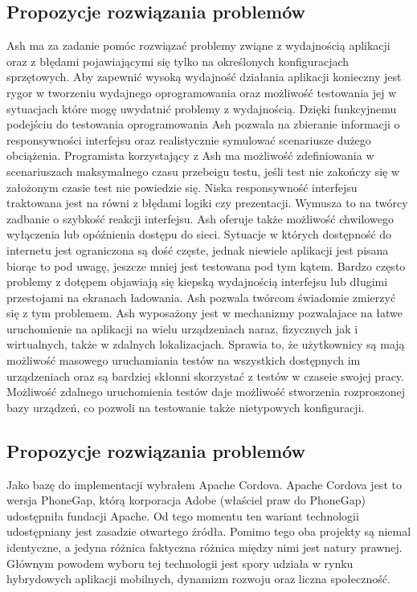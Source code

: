 \documentclass[a4paper]{article}
\begin{document}
\subsection{Propozycje rozwiązania problemów}
Ash ma za zadanie pomóc rozwiązać problemy zwiąne z wydajnością aplikacji oraz z błędami pojawiającymi się tylko na określonych konfiguracjach sprzętowych. Aby zapewnić wysoką  wydajność działania aplikacji konieczny jest rygor w tworzeniu wydajnego oprogramowania oraz możliwość testowania jej w sytuacjach które mogę uwydatnić problemy z wydajnością. Dzięki funkcyjnemu podejściu do testowania oprogramowania Ash pozwala na zbieranie informacji o responsywności interfejsu oraz realistycznie symulować scenariusze dużego obciążenia. Programista korzystający z Ash ma możliwość zdefiniowania w scenariuszach maksymalnego czasu przebeigu testu, jeśli test nie zakończy się w założonym czasie test nie powiedzie się. Niska responsywność interfejsu traktowana jest na równi z błędami logiki czy prezentacji. Wymusza to na twórcy zadbanie o szybkość reakcji interfejsu. Ash oferuje także możliwość chwilowego wyłączenia lub opóźnienia dostępu do sieci. Sytuacje w których dostępność do internetu jest ograniczona są dość częste, jednak niewiele aplikacji jest pisana biorąc to pod uwagę, jeszcze mniej jest testowana pod tym kątem. Bardzo często problemy z dotępem objawiają się kiepską wydajnością interfejsu lub długimi przestojami na ekranach ładowania. Ash pozwala twórcom świadomie zmierzyć się z tym problemem. Ash wyposażony jest w mechanizmy pozwalajace na łatwe uruchomienie na aplikacji na wielu urządzeniach naraz, fizycznych jak i wirtualnych, także w zdalnych lokalizacjach. Sprawia to, że użytkownicy są mają możliwość masowego uruchamiania testów na wszystkich dostępnych im urządzeniach oraz są bardziej skłonni skorzystać z testów w czaseie swojej pracy. Możliwość zdalnego uruchomienia testów daje możliwość stworzenia rozproszonej bazy urządzeń, co pozwoli na testowanie także nietypowych konfiguracji. 

\subsection{Propozycje rozwiązania problemów}
Jako bazę do implementacji wybrałem Apache Cordova. Apache Cordova jest to wersja PhoneGap, którą korporacja Adobe (właściel praw do PhoneGap) udostępniła fundacji Apache. Od tego momentu ten wariant technologii udostępniany jest zasadzie otwartego źródła. Pomimo tego oba projekty są niemal identyczne, a jedyna różnica faktyczna różnica między nimi jest natury prawnej. Głównym powodem wyboru tej technologii jest spory udziała w rynku hybrydowych aplikacji mobilnych, dynamizm rozwoju oraz liczna społeczność.
\end{document}
